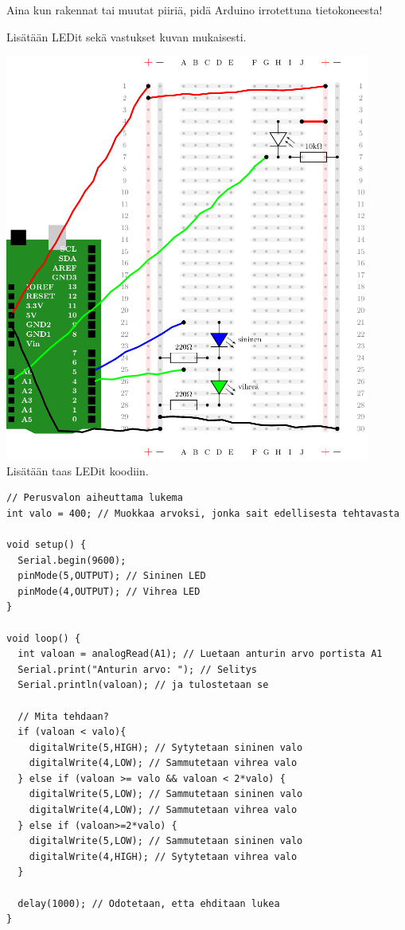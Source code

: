 \begin{tcolorbox}[colback=red!10,colbacktitle=red,title=HUOM!]
Aina kun rakennat tai muutat piiriä, pidä Arduino irrotettuna tietokoneesta! 
\end{tcolorbox}

\clearpage
Lisätään LEDit sekä vastukset kuvan mukaisesti.

\includegraphics[width=0.9\textwidth]{kuvat/kuva15.pdf}
\clearpage
Lisätään taas LEDit koodiin. 
\begin{lstlisting}[numbers=none]
// Perusvalon aiheuttama lukema
int valo = 400; // Muokkaa arvoksi, jonka sait edellisesta tehtavasta

void setup() {
  Serial.begin(9600);
  pinMode(5,OUTPUT); // Sininen LED
  pinMode(4,OUTPUT); // Vihrea LED
}

void loop() {
  int valoan = analogRead(A1); // Luetaan anturin arvo portista A1
  Serial.print("Anturin arvo: "); // Selitys
  Serial.println(valoan); // ja tulostetaan se

  // Mita tehdaan? 
  if (valoan < valo){
    digitalWrite(5,HIGH); // Sytytetaan sininen valo
    digitalWrite(4,LOW); // Sammutetaan vihrea valo
  } else if (valoan >= valo && valoan < 2*valo) {
    digitalWrite(5,LOW); // Sammutetaan sininen valo
    digitalWrite(4,LOW); // Sammutetaan vihrea valo
  } else if (valoan>=2*valo) {
    digitalWrite(5,LOW); // Sammutetaan sininen valo
    digitalWrite(4,HIGH); // Sytytetaan vihrea valo
  }

  delay(1000); // Odotetaan, etta ehditaan lukea
}
\end{lstlisting}

